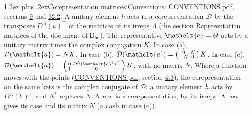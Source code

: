 \documentclass[10pt,a4paper]{article}
\makeatletter
\renewcommand\section{\@startsection{section}{1}{\z@}{-3ex plus -1ex minus -.2ex}%
  {1.2ex plus .2ex}{\normalfont\large\sffamily\bfseries\color{parttitle}}}
\numberwithin{equation}{section}
\newcommand{\eltfont}[1]{{\let\sigma\eltsigma\mathelt{#1}}}
\newcommand{\grp}[1]{\mathsf{#1}}
\newcommand{\elt}[1]{\eltfont{#1}}
\makeatother
\begin{document}
\section{Corepresentation matrices}\label{s:corep_matrices}
Conventions: \href{../../CONVENTIONS.pdf}{CONVENTIONS.pdf}, sections \href{../../../rotation/CONVENTIONS.pdf\#conv.9}{9} and \href{../../CONVENTIONS.pdf\#conv.32.2}{32.2}.
A unitary element $h$ acts in a corepresentation $\mathcal{D}$ by the transposes $D^{\Lambda}(h)^{\top}$ of the matrices of its irreps $\Lambda$ (the section Representation matrices of the document of \href{../../../rotation/data/pdf/D6d.pdf}{$\grp{D_{6d}}$}). The representative $\elt{a} = \varTheta$ acts by a unitary matrix times the complex conjugation $K$.
In case (a), $\mathcal{D}(\elt{a}) = NK$. In case (b), $\mathcal{D}(\elt{a}) = \left(\begin{smallmatrix} 0 & N \\ -N & 0 \end{smallmatrix}\right) K$. In case (c), $\mathcal{D}(\elt{a}) = \left(\begin{smallmatrix} 0 & D^{\Lambda}(\elt{a}^2)^{\top} \\ 1 & 0 \end{smallmatrix}\right) K$, with no matrix $N$.
Where a function moves with the points (\href{../../CONVENTIONS.pdf}{CONVENTIONS.pdf}, section \href{../../../rotation/CONVENTIONS.pdf\#conv.4.3}{4.3}), the corepresentation on the same kets is the complex conjugate of $\mathcal{D}$: a unitary element $h$ acts by $D^{\Lambda}(h)^{\dagger}$, and $N^{*}$ replaces $N$.
A row is a corepresentation, by its irreps. A row gives its case and its matrix $N$ (a dash in case (c)).
\end{document}
